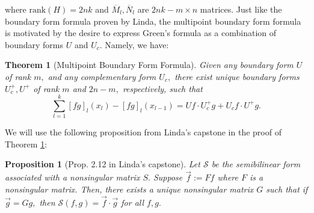 \documentclass[11pt,reqno,oneside,a4paper]{article}
\theoremstyle{plain} %
\newtheorem{theorem}{Theorem}
\newtheorem{proposition}{Proposition}
\theoremstyle{definition}
\theoremstyle{remark}
\begin{document}
where $\mathrm{rank}(H) = 2nk$ and $\overline{M}_l, \overline{N}_l$ are $2nk-m \times n$ matrices. Just like the boundary form formula proven by Linda, the multipoint boundary form formula is motivated by the desire to express Green's formula as a combination of boundary forms $U$ and $U_c.$ Namely, we have:
\newline
\begin{theorem}[Multipoint Boundary Form Formula]\label{mbff}
Given any boundary form $U$ of rank $m,$ and any complementary form $U_c,$ there exist unique boundary forms $U^+_c, U^+$ of rank $m$ and $2n-m,$ respectively, such that
\[ 
\sum_{l=1}^{k} [fg]_l(x_l) - [fg]_l(x_{l-1}) = Uf\cdot U^+_c g + U_c f \cdot U^+ g.
\]
\end{theorem}
We will use the following proposition from Linda's capstone \cite{linfan} in the proof of Theorem \ref{mbff}:
\newline
\begin{proposition}[Prop. 2.12 in Linda's capstone]\label{linfan-2.12}
Let $\mathcal{S}$ be the semibilinear form associated with a nonsingular matrix $S.$ Suppose $\vec{f} := Ff$ where $F$ is a nonsingular matrix. Then, there exists a unique nonsingular matrix $G$ such that if $\vec{g} =Gg,$ then $\mathcal{S}(f,g) = \vec{f}\cdot \vec{g}$ for all $f,g.$
\end{proposition}
\end{document}
